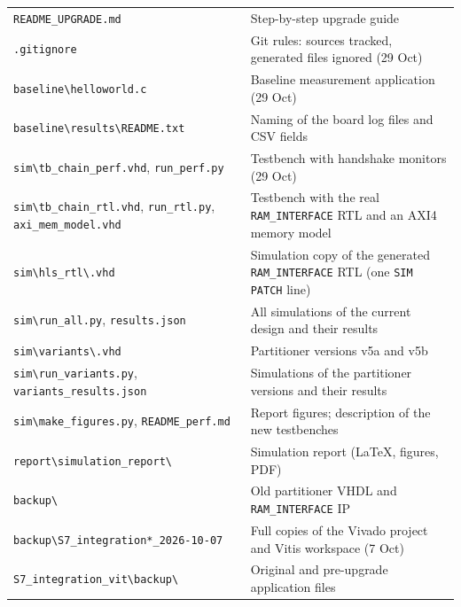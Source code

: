 \documentclass[11pt,a4paper]{article}
\newcommand{\code}[1]{\texttt{#1}}
\begin{document}
\begin{longtable}{@{}p{}p{}@{}}
\code{README\_UPGRADE.md} & Step-by-step upgrade guide \\
\code{.gitignore} & Git rules: sources tracked, generated files ignored (29 Oct) \\
\code{baseline\textbackslash helloworld.c} & Baseline measurement application (29 Oct) \\
\code{baseline\textbackslash results\textbackslash README.txt} & Naming of the board log files and CSV fields \\
\code{sim\textbackslash tb\_chain\_perf.vhd}, \code{run\_perf.py} & Testbench with handshake monitors (29 Oct) \\
\code{sim\textbackslash tb\_chain\_rtl.vhd}, \code{run\_rtl.py}, \code{axi\_mem\_model.vhd} & Testbench with the real \code{RAM\_INTERFACE} RTL and an AXI4 memory model \\
\code{sim\textbackslash hls\_rtl\textbackslash *.vhd} & Simulation copy of the generated \code{RAM\_INTERFACE} RTL (one \code{SIM PATCH} line) \\
\code{sim\textbackslash run\_all.py}, \code{results.json} & All simulations of the current design and their results \\
\code{sim\textbackslash variants\textbackslash *.vhd} & Partitioner versions v5a and v5b \\
\code{sim\textbackslash run\_variants.py}, \code{variants\_results.json} & Simulations of the partitioner versions and their results \\
\code{sim\textbackslash make\_figures.py}, \code{README\_perf.md} & Report figures; description of the new testbenches \\
\code{report\textbackslash simulation\_report\textbackslash *} & Simulation report (\LaTeX{}, figures, PDF) \\
\midrule
\code{backup\textbackslash *} & Old partitioner VHDL and \code{RAM\_INTERFACE} IP \\
\code{backup\textbackslash S7\_integration*\_2026-10-07} & Full copies of the Vivado project and Vitis workspace (7 Oct) \\
\code{S7\_integration\_vit\textbackslash backup\textbackslash *} & Original and pre-upgrade application files \\
\bottomrule
\end{longtable}

\end{document}
